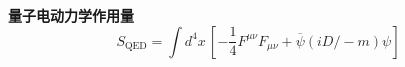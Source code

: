 \textbf{量子电动力学作用量 } 
\[
S_{\text{QED}} = \int d^4x \, \left[-\frac{1}{4} F^{\mu \nu} F_{\mu \nu} + \overline{\psi} \left( iD\!\!\!\!\big/ - m \right) \psi \right]~
\]


















































































































